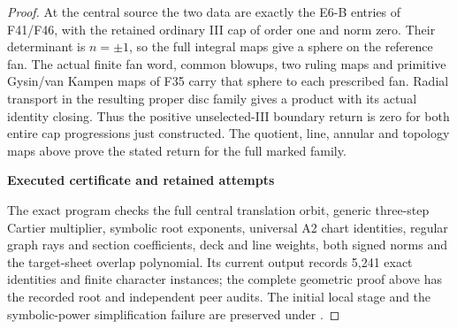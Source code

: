 \begin{proof}
At the central source the two data are exactly the E6-B
entries of F41/F46, with the retained ordinary III cap of
order one and norm zero. Their determinant is \(n=\pm1\),
so the full integral maps give a sphere on the reference fan.
The actual finite fan word, common blowups, two ruling maps
and primitive Gysin/van Kampen maps of F35 carry that sphere
to each prescribed fan. Radial transport in the resulting
proper disc family gives a product with its actual identity
closing. Thus the positive unselected-III boundary return is
zero for both entire cap progressions just constructed.
The quotient, line, annular and topology maps above prove the stated return for the full marked family.

\par

\medskip\noindent\textbf{Executed certificate and retained attempts}

\par\nobreak

The exact program 
checks the full central translation orbit, generic three-step
Cartier multiplier, symbolic root exponents, universal A2 chart
identities, regular graph rays and section coefficients, deck and
line weights, both signed norms and the target-sheet overlap
polynomial. Its current output records 5,241 exact identities
and finite character instances; the complete geometric proof above has the recorded root and independent peer audits.
The initial local stage and the symbolic-power simplification
failure are preserved under
.

\end{proof}
